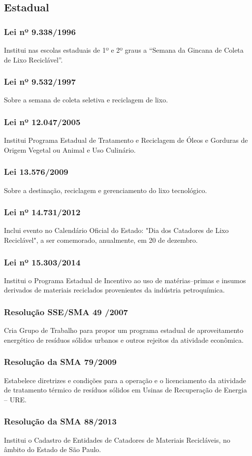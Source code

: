 \begin{subapend}
	\subsection{Estadual}
	\begin{subsubapend}
		\subsubsection{Lei nº 9.338/1996}
		Institui nas escolas estaduais de 1º e 2º graus a “Semana da Gincana de Coleta de Lixo Reciclável”.
		\subsubsection{Lei nº 9.532/1997}
		Sobre a semana de coleta seletiva e reciclagem de lixo.
		\subsubsection{Lei nº 12.047/2005}
		Institui Programa Estadual de Tratamento e Reciclagem de Óleos e Gorduras de Origem Vegetal ou Animal e Uso Culinário.
		\subsubsection{Lei 13.576/2009}
		Sobre a destinação, reciclagem e gerenciamento do lixo tecnológico.
		\subsubsection{Lei nº 14.731/2012}
		Inclui evento no Calendário Oficial do Estado: "Dia dos Catadores de Lixo Reciclável", a ser comemorado, anualmente, em 20 de dezembro.
		\subsubsection{Lei nº 15.303/2014}
		Institui o Programa Estadual de Incentivo ao uso de matérias–primas e insumos derivados de materiais reciclados provenientes da indústria petroquímica.
		\subsubsection{Resolução SSE/SMA 49 /2007}
		Cria Grupo de Trabalho para propor um programa estadual de aproveitamento energético de resíduos sólidos urbanos e outros rejeitos da atividade econômica.
		\subsubsection{Resolução da SMA 79/2009}
		Estabelece diretrizes e condições para a operação e o licenciamento da atividade de tratamento térmico de resíduos sólidos em Usinas de Recuperação de Energia – URE.
		\subsubsection{Resolução da SMA 88/2013}
		Institui o Cadastro de Entidades de Catadores de Materiais Recicláveis, no âmbito do Estado de São Paulo.
		
	\end{subsubapend}
\end{subapend}


